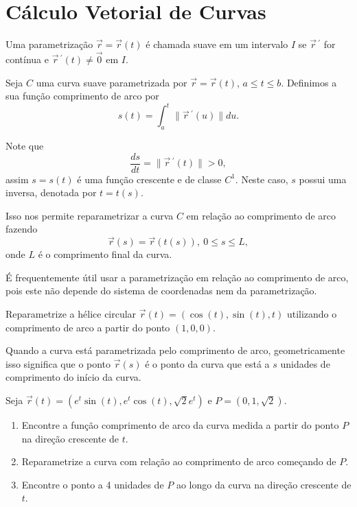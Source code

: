 \section{Cálculo Vetorial de Curvas}


\begin{definb}{}{}
Uma parametrização {\color{red} $\vec{r}=\vec{r}(t)$} é chamada {\color{blue} suave} em um intervalo $I$ se {\color{red}$\vec{r}\,^\prime$} for contínua e {\color{red}$\vec{r}\,^\prime(t)\neq \vec{0}$} em $I$.
\end{definb}



Seja $C$ uma curva {\color{blue}suave} parametrizada por $\vec{r}=\vec{r}(t)$, $a\leq t\leq b$. Definimos a sua {\color{blue} função comprimento de arco} por
\[s(t)=\int_a^t\|\vec{r}\,^\prime (u)\|du.\]

Note que
\[\frac{ds}{dt}=\|\vec{r}\,^\prime (t)\|> 0,\]
assim $s=s(t)$ é uma {\color{red}função crescente} e de classe $C^1$. Neste caso, $s$ possui uma inversa, denotada por $t=t(s)$.

\vfill

Isso nos permite {\color{red} reparametrizar a curva $C$ em relação ao comprimento de arco} fazendo
\[\vec{r}(s)=\vec{r}(t(s)),\ 0\leq s\leq L,\]
onde $L$ é o comprimento final da curva.

\begin{caixaazul}{}{}
É frequentemente útil usar a parametrização em relação ao comprimento de arco, pois este não depende do sistema de coordenadas nem da parametrização.
\end{caixaazul}
\newpage


\begin{exeb}{}{}
Reparametrize a hélice circular $\vec{r}(t)=(\cos(t),\sin(t),t)$ utilizando o comprimento de arco a partir do ponto $(1,0,0)$.
\end{exeb}
\vfill

\begin{caixaazul}{}{}
Quando a curva está parametrizada pelo comprimento de arco, geometricamente isso significa que o ponto $\vec{r}(s)$  é o ponto da curva que está a $s$ unidades de comprimento do início da curva.
\end{caixaazul}
\newpage

\begin{casab}{}{}
Seja $\vec{r}(t)=(e^t\sin(t),e^t\cos(t),\sqrt{2}e^t)$ e $P=(0,1,\sqrt{2})$.
\begin{enumerate}
\item Encontre a função comprimento de arco da curva medida a partir do ponto $P$ na direção crescente de $t$.
\item Reparametrize a curva com relação ao comprimento de arco começando de $P$.
\item Encontre o ponto a 4 unidades de $P$ ao longo da curva na direção crescente de $t$.
\end{enumerate}
\end{casab}
\newpage

